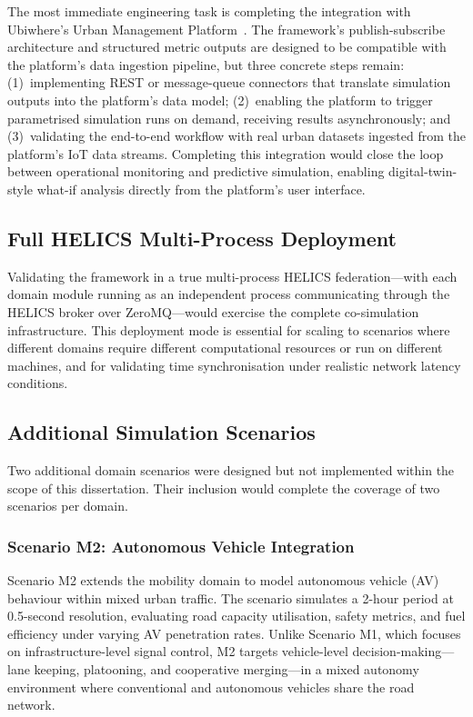 The most immediate engineering task is completing the integration with Ubiwhere's Urban Management Platform~\cite{ubiwhere_urban_platform}. The framework's publish-subscribe architecture and structured metric outputs are designed to be compatible with the platform's data ingestion pipeline, but three concrete steps remain: (1)~implementing REST or message-queue connectors that translate simulation outputs into the platform's data model; (2)~enabling the platform to trigger parametrised simulation runs on demand, receiving results asynchronously; and (3)~validating the end-to-end workflow with real urban datasets ingested from the platform's IoT data streams. Completing this integration would close the loop between operational monitoring and predictive simulation, enabling digital-twin-style what-if analysis directly from the platform's user interface.

\subsection{Full HELICS Multi-Process Deployment}

Validating the framework in a true multi-process HELICS federation---with each domain module running as an independent process communicating through the HELICS broker over ZeroMQ---would exercise the complete co-simulation infrastructure. This deployment mode is essential for scaling to scenarios where different domains require different computational resources or run on different machines, and for validating time synchronisation under realistic network latency conditions.

\subsection{Additional Simulation Scenarios}

Two additional domain scenarios were designed but not implemented within the scope of this dissertation. Their inclusion would complete the coverage of two scenarios per domain.

\subsubsection{Scenario M2: Autonomous Vehicle Integration}

Scenario M2 extends the mobility domain to model autonomous vehicle (AV) behaviour within mixed urban traffic. The scenario simulates a 2-hour period at 0.5-second resolution, evaluating road capacity utilisation, safety metrics, and fuel efficiency under varying AV penetration rates. Unlike Scenario M1, which focuses on infrastructure-level signal control, M2 targets vehicle-level decision-making---lane keeping, platooning, and cooperative merging---in a mixed autonomy environment where conventional and autonomous vehicles share the road network.

